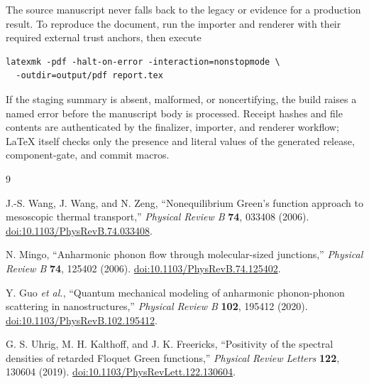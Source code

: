 \documentclass[11pt]{article}
\newcommand{\code}[1]{\texttt{\detokenize{#1}}}
\renewcommand{\_}{\OriginalTextUnderscore\allowbreak}
\begin{document}
The source manuscript never falls back to the legacy  or
 evidence for a production result. To reproduce the document,
run the importer and renderer with their required external trust anchors,
then execute
\begin{verbatim}
latexmk -pdf -halt-on-error -interaction=nonstopmode \
  -outdir=output/pdf report.tex
\end{verbatim}
If the staging summary is absent, malformed, or noncertifying, the build
raises a named \code{NEGFPy toy-gate report} error before the manuscript body
is processed. Receipt hashes and file contents are authenticated by the
finalizer, importer, and renderer workflow; LaTeX itself checks only the
presence and literal values of the generated release, component-gate, and
commit macros.

\clearpage
\begin{thebibliography}{9}

J.-S. Wang, J. Wang, and N. Zeng,
``Nonequilibrium Green's function approach to mesoscopic thermal transport,''
\emph{Physical Review B} \textbf{74}, 033408 (2006).
\href{https://doi.org/10.1103/PhysRevB.74.033408}
{doi:10.1103/PhysRevB.74.033408}.

N. Mingo,
``Anharmonic phonon flow through molecular-sized junctions,''
\emph{Physical Review B} \textbf{74}, 125402 (2006).
\href{https://doi.org/10.1103/PhysRevB.74.125402}
{doi:10.1103/PhysRevB.74.125402}.

Y. Guo \emph{et al.},
``Quantum mechanical modeling of anharmonic phonon-phonon scattering in
nanostructures,''
\emph{Physical Review B} \textbf{102}, 195412 (2020).
\href{https://doi.org/10.1103/PhysRevB.102.195412}
{doi:10.1103/PhysRevB.102.195412}.

G. S. Uhrig, M. H. Kalthoff, and J. K. Freericks,
``Positivity of the spectral densities of retarded Floquet Green functions,''
\emph{Physical Review Letters} \textbf{122}, 130604 (2019).
\href{https://doi.org/10.1103/PhysRevLett.122.130604}
{doi:10.1103/PhysRevLett.122.130604}.

\end{thebibliography}
\end{document}
